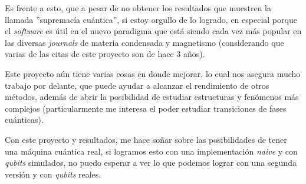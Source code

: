 Es frente a esto, que a pesar de no obtener los resultados que muestren la llamada ''supremacía cuántica'', si estoy orgullo de lo logrado, en especial porque el \textit{software} es útil en el nuevo paradigma que está siendo cada vez más popular en las diversas \textit{journals} de materia condensada y magnetismo (considerando que varias de las citas de este proyecto son de hace 3 años).

Este proyecto aún tiene varias cosas en donde mejorar, lo cual nos asegura mucho trabajo por delante, que puede ayudar a alcanzar el rendimiento de otros métodos, además de abrir la posibilidad de estudiar estructuras y fenómenos más complejos (particularmente me interesa el poder estudiar transiciones de fases cuánticas).

Con este proyecto y resultados, me hace soñar sobre las posibilidades de tener una máquina cuántica real, si logramos esto con una implementación \textit{naive} y con \textit{qubits} simulados, no puedo esperar a ver lo que podemos lograr con una segunda versión y con \textit{qubits} reales.
